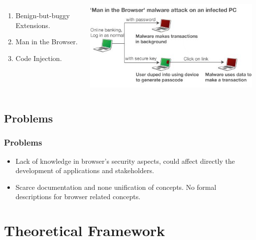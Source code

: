 \documentclass[serif,9pt]{beamer}
\begin{document}
\begin{frame}
\begin{columns}
\begin{minipage}[c][0.4\textheight][c]{\linewidth}
\begin{enumerate}
	  \item Benign-but-buggy Extensions.
	  \item Man in the Browser.
	  \item Code Injection.
	  \end{enumerate}
	\end{minipage}
	\begin{minipage}[c][0.4\textheight][c]{\linewidth}
	  \centering
	  \includegraphics[scale=0.45]{figures/_58291188_malware_464v2.jpg}
	\end{minipage}
	\end{columns}
\end{frame}

\subsection{Problems}
\begin{frame}
	\frametitle{Problems}
	\begin{itemize}
		\item<1-> Lack of knowledge in browser's security aspects, could affect directly the development of applications and stakeholders. 
		\item<2-> Scarce documentation and none unification of concepts. No formal descriptions for browser related concepts.
	\end{itemize}
\end{frame}

\section{Theoretical Framework}
\end{document}
